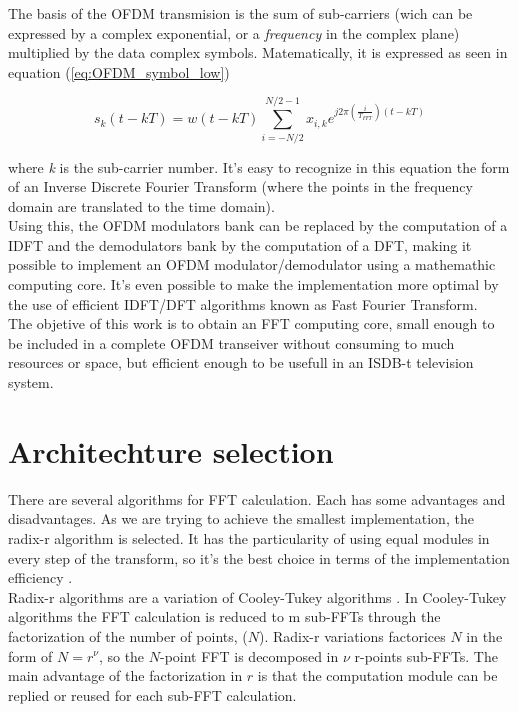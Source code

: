 \documentclass[conference]{IEEEtran}
\begin{document}
The basis of the OFDM transmision is the sum of sub-carriers (wich can be expressed by a complex exponential, or a \textit{frequency}
in the complex plane) multiplied by the data complex symbols. Matematically, it is expressed as seen in equation (\ref{eq:OFDM_symbol_low})

\begin{equation}
s_{k}(t-kT) =
	w(t-kT) \sum\limits_{i=-N/2}^{N/2-1} x_{i,k} e^{j2\pi
	\left(\frac{i}{T_{FFT}}\right)(t-kT)}
\label{eq:OFDM_symbol_low}
\end{equation}

where \textit{k} is the sub-carrier number. It's easy to recognize in this equation the form of an Inverse Discrete Fourier Transform 
(where the points in the frequency domain are translated to the time domain).\\
Using this, the OFDM modulators bank can be replaced by the computation of a IDFT and the demodulators bank by the computation of a
DFT, making it possible to implement an OFDM modulator/demodulator using a mathemathic computing core. It's even possible to make the 
implementation more optimal by the use of efficient IDFT/DFT algorithms known as Fast Fourier Transform.\\

The objetive of this work is to obtain an FFT computing core, small enough to be included in a complete OFDM transeiver without consuming 
to much resources or space, but efficient enough to be usefull in an ISDB-t television system.

\section{Architechture selection}

There are several algorithms for FFT calculation. Each has some advantages and disadvantages. As we are trying to achieve the smallest
implementation, the radix-r algorithm is selected. It has the particularity of using equal modules in every step of the transform, so
it's the best choice in terms of the implementation efficiency \cite{Schaffer2_3}.\\
Radix-r algorithms are a variation of Cooley-Tukey algorithms \cite{MeyerRadix}. In Cooley-Tukey algorithms the FFT calculation is reduced
to m sub-FFTs through the factorization of the number of points, ($N$). Radix-r variations factorices $N$ in the form of $N = r^\nu$, so the $N$-point FFT 
is decomposed in $\nu$ r-points sub-FFTs. The main advantage of the factorization in $r$ is that the computation module can be replied or reused
for each sub-FFT calculation.\\
\end{document}
